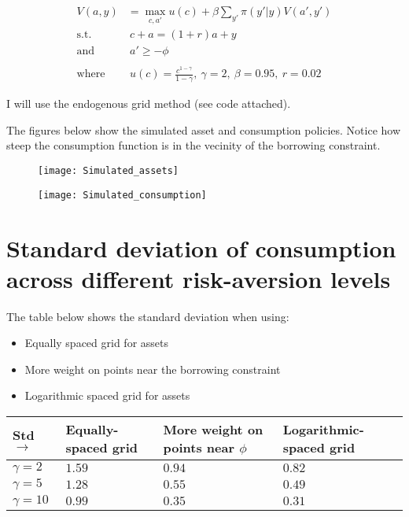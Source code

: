 \documentclass[letter,11pt]{article}
\begin{document}
\begin{align*}
V(a,y) & = \max_{c,a'} u(c) + \beta \sum_{y'} \pi(y'|y) V(a',y') \\
\text{s.t. } & \ c+a = (1+r) a + y \\
\text{and} & \ a' \ge -\phi \\ \\
\text{where } & \ u(c) = \frac{c^{1-\gamma}}{1-\gamma}, \  \gamma=2, \ \beta=0.95, \ r=0.02
\end{align*}

I will use the endogenous grid method (see code attached).    

The figures below show the simulated asset and consumption policies. Notice how steep the consumption function is in the vecinity of the borrowing constraint.

\begin{figure}[h!]
\centering
\begin{minipage}{.5\textwidth}
  \centering
  \texttt{[image: Simulated\_assets]}
 \end{minipage}%
\begin{minipage}{.5\textwidth}
  \centering
  \texttt{[image: Simulated\_consumption]}
 \end{minipage}
\end{figure}


\section{Standard deviation of consumption across different risk-aversion levels}
\hfill

The table below shows the standard deviation when using:

\begin{itemize}[noitemsep]
\item Equally spaced grid for assets
\item More weight on points near the borrowing constraint
\item Logarithmic spaced grid for assets
\end{itemize}

\begin{tabular}{ l | l | l | l }
  Std $\rightarrow $ & Equally-spaced grid & More weight on points near $\phi$ & Logarithmic-spaced grid \\ \hline
$\gamma=2$ 	& $1.59$ 		& $0.94$ 		& $0.82$ \\
$\gamma=5$  	& $1.28$ 		& $0.55$ 		& $0.49$ \\
 $\gamma=10$ 	& $0.99$ 		& $0.35$ 		& $0.31$ \\ \hline
\end{tabular}
\end{document}
